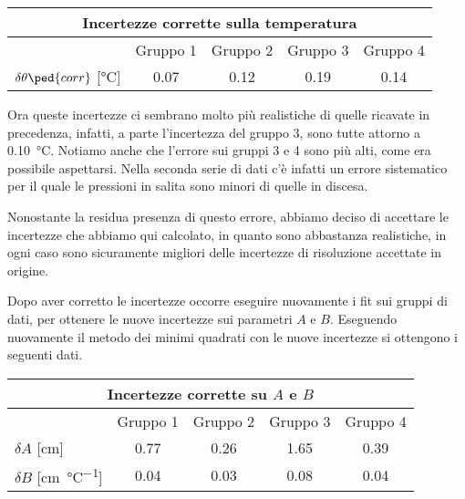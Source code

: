 \begin{center}
    \begin{tabular}{l c c c c}
        \multicolumn{5}{c}{\textbf{Incertezze corrette sulla temperatura}} \\
        \toprule
        & Gruppo 1 & Gruppo 2 & Gruppo 3 & Gruppo 4 \\
        \midrule
        $\delta \theta\ped{corr}$ [\si{\celsius}] & 0.07 & 0.12 & 0.19 & 0.14 \\
        \bottomrule
    \end{tabular}
\end{center}

Ora queste incertezze ci sembrano molto più realistiche di quelle ricavate in precedenza, infatti, a parte l'incertezza del 
gruppo 3, sono tutte attorno a \SI{0.10}{\celsius}. Notiamo anche che l'errore sui gruppi 3 e 4 sono più alti, come era possibile aspettarsi.
Nella seconda serie di dati c'è infatti un errore sistematico per il quale le pressioni in salita sono minori di quelle in discesa.

Nonostante la residua presenza di questo errore, abbiamo deciso di accettare le incertezze che abbiamo qui calcolato, in quanto
sono abbastanza realistiche, in ogni caso sono sicuramente migliori delle incertezze di risoluzione accettate in origine.

Dopo aver corretto le incertezze occorre eseguire nuovamente i fit sui gruppi di dati, per ottenere le nuove incertezze sui parametri
$A$ e $B$. Eseguendo nuovamente il metodo dei minimi quadrati con le nuove incertezze si ottengono i seguenti dati.

\begin{center}
    \begin{tabular}{l c c c c}
        \multicolumn{5}{c}{\textbf{Incertezze corrette su $A$ e $B$}} \\
        \toprule
        & Gruppo 1 & Gruppo 2 & Gruppo 3 & Gruppo 4 \\
        \midrule
        $\delta A$ [cm] & 0.77 & 0.26 & 1.65 & 0.39 \\
        $\delta B$ [\si{\centi\metre\per\celsius}] & 0.04 & 0.03 & 0.08 & 0.04 \\
        \bottomrule
    \end{tabular}
\end{center}
